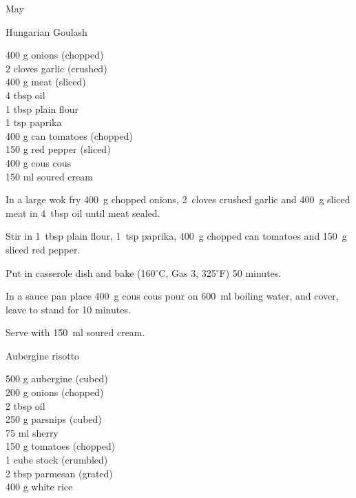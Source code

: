 \begin{menu}{May}
    \begin{recipe}{2}{Hungarian Goulash}%
		\begin{ingredients}
		400 g onions (chopped) \\
	2 cloves garlic (crushed) \\
	400 g meat (sliced) \\
	4 tbsp oil  \\
	1 tbsp plain flour  \\
	1 tsp paprika  \\
	400 g can tomatoes (chopped) \\
	150 g red pepper (sliced) \\
	400 g cous cous  \\
	150 ml soured cream  \\
	
		\end{ingredients}
	
    \begin{instructions}
    \item 
        In a large wok fry
        400~g chopped onions,
        2~cloves crushed garlic
        and
        400~g sliced meat
        in
        4~tbsp  oil
        until meat sealed.
      \item 
        Stir in
        1~tbsp  plain flour,
        1~tsp  paprika,
        400~g chopped can tomatoes
        and
        150~g sliced red pepper.
      \item 
        Put in casserole dish and bake (160$^{\circ}$C, Gas 3, 325$^{\circ}$F) 50 minutes.
      \item 
      In a
      sauce pan 
      place
      400~g  cous cous
      pour on
      600~ml  boiling water,
      and cover, leave to stand for 10 minutes.
    \item 
        Serve with
        150~ml  soured cream.
      
    \end{instructions}
    \end{recipe}%
  
    \begin{recipe}{2}{Aubergine risotto}%
		\begin{ingredients}
		500 g aubergine (cubed) \\
	200 g onions (chopped) \\
	2 tbsp oil  \\
	250 g parsnips (cubed) \\
	75 ml sherry  \\
	150 g tomatoes (chopped) \\
	1 cube stock (crumbled) \\
	2 tbsp parmesan (grated) \\
	400 g white rice  \\
	

\end{ingredients}
\end{recipe}
\end{menu}
